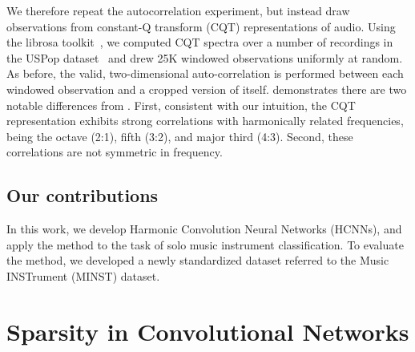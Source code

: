\documentclass{article}
\begin{document}
We therefore repeat the autocorrelation experiment, but instead draw observations from constant-Q transform (CQT) representations of audio.
Using the librosa toolkit~\cite{librosa041}, we computed CQT spectra over a number of recordings in the USPop dataset~\cite{berenzweig2004large} and drew 25K windowed observations uniformly at random.
As before, the valid, two-dimensional auto-correlation is performed between each windowed observation and a cropped version of itself.
 demonstrates there are two notable differences from .
First, consistent with our intuition, the CQT representation exhibits strong correlations with harmonically related frequencies, being the octave (2:1), fifth (3:2), and major third (4:3).
Second, these correlations are not symmetric in frequency.

\begin{figure}
\label{fig:cqt_corr}
\end{figure}

\begin{figure}
\label{fig:image_corr}
\end{figure}

\subsection{Our contributions}
In this work, we develop Harmonic Convolution Neural Networks (HCNNs), and apply the method to the task of solo music instrument classification.
To evaluate the method, we developed a newly standardized dataset referred to the Music INSTrument (MINST) dataset.


\section{Sparsity in Convolutional Networks}\label{sec:page_size}

\end{document}
